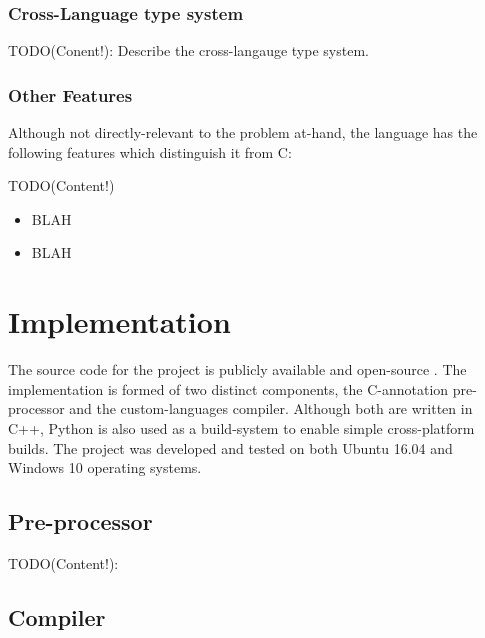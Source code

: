 \documentclass[a4paper,12pt,twoside,openright]{report}
\begin{document}
\subsection{Cross-Language type system}

TODO(Conent!): Describe the cross-langauge type system.

\subsection{Other Features}

Although not directly-relevant to the problem at-hand, the language has the
following features which distinguish it from C:

TODO(Content!)

\begin{itemize}

    \item BLAH

    \item BLAH

\end{itemize}

\chapter{Implementation}


The source code for the project is publicly available and open-source
\cite{ProjectSource}. The implementation is formed of two distinct components,
the C-annotation pre-processor and the custom-languages compiler. Although both
are written in C++, Python is also used as a build-system to enable simple
cross-platform builds. The project was developed and tested on both Ubuntu
16.04 and Windows 10 operating systems.

\section{Pre-processor}

TODO(Content!):

\section{Compiler}
\end{document}
